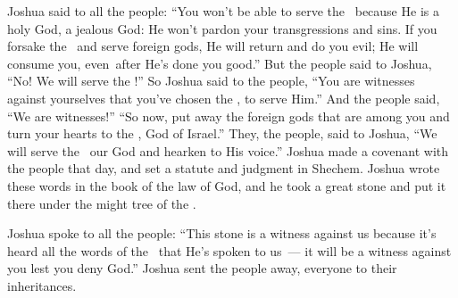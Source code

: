 \begin{inparaenum}
   Joshua said to all the people: ``You won't be able to serve the \lord\ because He is a holy God, a jealous God: He won't pardon your transgressions and sins.%
   If you forsake the \lord\ and serve foreign gods, He will return and do you evil; He will consume you, even\understood\ after He's done you good.''%
   But the people said to Joshua, ``No! We will serve the \lord!''%
   So Joshua said to the people, ``You are witnesses against yourselves that you've chosen the \lord, to serve Him.'' And the people said, ``We are witnesses!''%
   ``So now, put away the foreign gods that are among you and turn your hearts to the \lord, God of Israel.''%
   They, the people, said to Joshua, ``We will serve the \lord\ our God and hearken to His voice.''%
   Joshua made a covenant with the people that day, and set a statute and judgment in Shechem.%
   Joshua wrote these words in the book of the law of God, and he took a great stone and put it there under the might tree of the \lord.%
  
   Joshua spoke to all the people: ``This stone is a witness against us because it's heard all the words of the \lord\ that He's spoken to us~--- it will be a witness against you lest you deny God.''%
   Joshua sent the people away, everyone to their inheritances.%
  

\end{inparaenum}

